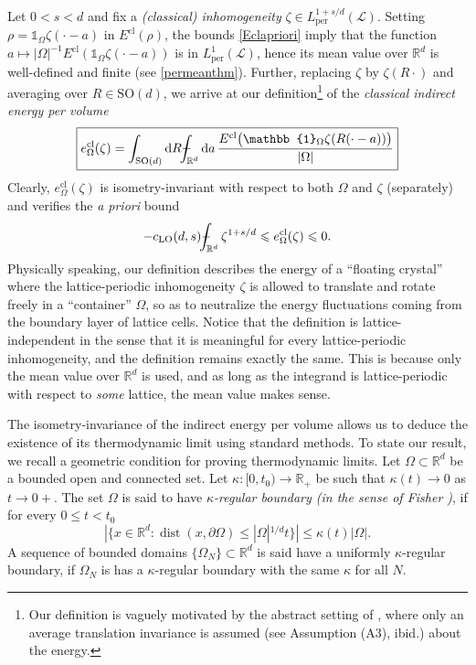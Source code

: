 \documentclass[final,onefignum,onetabnum,reqno]{amsart}
\theoremstyle{remark}
\renewcommand{\le}{\leqslant}
\DeclareMathOperator{\dist}{dist}
\newcommand{\RR}{\mathbb{R}}
\newcommand{\SO}{\mathrm{SO}}
\newcommand{\per}{\mathrm{per}} %
\newcommand{\cl}{\mathrm{cl}} %
\newcommand{\LO}{\mathrm{LO}} %
\newcommand{\iden}{\mathbb{1}} %
\newcommand{\dd}{\mathrm{d}} %
\def\Xint#1{\mathchoice
{\XXint\displaystyle\textstyle{#1}}%
{\XXint\textstyle\scriptstyle{#1}}%
{\XXint\scriptstyle\scriptscriptstyle{#1}}%
{\XXint\scriptscriptstyle\scriptscriptstyle{#1}}%
\!\int}
\def\XXint#1#2#3{{\setbox0=\hbox{$#1{#2#3}{\int}$ }
\vcenter{\hbox{$#2#3$ }}\kern-.6\wd0}}
\def\dashint{\Xint-}
\newcommand{\LC}{\mathcal{L}}
\begin{document}
Let $0<s<d$ and fix a \emph{(classical) inhomogeneity} $\zeta\in L_\per^{1+s/d}(\LC)$. Setting $\rho=\iden_\Omega\zeta(\cdot-a)$ in $E^\cl(\rho)$, the bounds \cref{Eclapriori} imply that the function $a\mapsto |\Omega|^{-1} E^\cl(\iden_\Omega\zeta(\cdot-a))$ 
 is in $L_\per^1(\LC)$, hence its mean value over $\RR^d$ is well-defined and finite (see \cref{permeanthm}).
  Further, replacing $\zeta$ by $\zeta(R\cdot)$ and averaging over
 $R\in\SO(d)$, we arrive at our definition\footnote{Our definition is vaguely motivated by the abstract setting of \cite{HAINZL2009454}, where only an average translation invariance is assumed (see Assumption (A3), ibid.) about the energy.} of the \emph{classical indirect energy per volume}
$$
\boxed{e_\Omega^\cl(\zeta)=\int_{\SO(d)}\dd R \dashint_{\RR^d}\dd a\, \frac{E^\cl\bigl(\iden_\Omega \zeta(R(\cdot-a))\bigr)}{|\Omega|}}
$$
Clearly, $e_\Omega^\cl(\zeta)$ is isometry-invariant with respect to both $\Omega$ and $\zeta$ (separately) and verifies the \emph{a priori} bound
\begin{equation}\label{ecllobound}
-c_\LO(d,s) \dashint_{\RR^d} \zeta^{1+s/d}\le e_\Omega^\cl(\zeta)\le 0. 
\end{equation}
Physically speaking, our definition describes the energy of a ``floating crystal'' where the lattice-periodic inhomogeneity $\zeta$ 
is allowed to translate and rotate freely in a ``container'' $\Omega$, so as to neutralize the energy fluctuations coming from the boundary layer of lattice cells. 
Notice that the definition is lattice-independent in the sense that it is meaningful for every lattice-periodic inhomogeneity, and the definition remains exactly the same.
This is because only the mean value over $\RR^d$ is used, and as long as the integrand is lattice-periodic with respect to \emph{some} lattice, the mean value makes sense.

The isometry-invariance of the indirect energy per volume allows us to deduce the existence of its thermodynamic limit using standard methods.
To state our result, we recall a geometric condition for proving thermodynamic limits. Let $\Omega\subset\RR^d$ be a bounded open and connected set. Let $\kappa:[0,t_0)\to\RR_+$ be such that $\kappa(t)\to 0$ as $t\to 0+$. 
The set $\Omega$ is said to have \emph{$\kappa$-regular boundary (in the sense of Fisher \cite{fisher1964free})}, if for every $0\le t<t_0$
$$
|\{x\in\RR^d : \dist(x,\partial\Omega)\le |\Omega|^{1/d}t\}|\le \kappa(t)|\Omega|.
$$
A sequence of bounded domains $\{\Omega_N\}\subset\RR^d$ is said have a uniformly $\kappa$-regular boundary, if $\Omega_N$ is has a $\kappa$-regular boundary with the same $\kappa$ for all $N$.
\end{document}
